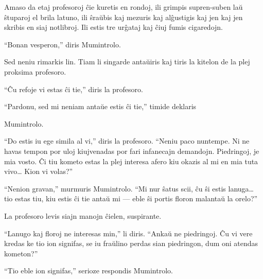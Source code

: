 Amaso da etaj profesoroj ĉie kuretis en rondoj, ili grimpis supren-suben laŭ ŝtuparoj el brila latuno, ili ŝraŭbis kaj mezuris kaj alĝustigis kaj jen kaj jen skribis en siaj notlibroj. Ili estis tre urĝataj kaj ĉiuj fumis cigaredojn.

``Bonan vesperon,'' diris Mumintrolo.

Sed neniu rimarkis lin. Tiam li singarde antaŭiris kaj tiris la kitelon de la plej proksima profesoro.

``Ĉu refoje vi estas ĉi tie,'' diris la profesoro.

``Pardonu, sed mi neniam antaŭe estis ĉi tie,'' timide deklaris

Mumintrolo.

``Do estis iu ege simila al vi,'' diris la profesoro. ``Neniu paco nuntempe. Ni ne havas tempon por uloj kiujvenadas por fari infanecajn demandojn. Piedringoj, je mia vosto. Ĉi tiu kometo estas la plej interesa afero kiu okazis al mi en mia tuta vivo{\ldots} Kion vi volas?''

``Nenion gravan,'' murmuris Mumintrolo. ``Mi nur ŝatus scii, ĉu ŝi estis lanuga{\ldots} tio estas tiu, kiu estis ĉi tie antaŭ mi --- eble ŝi portis floron malantaŭ la orelo?''

La profesoro levis siajn manojn ĉielen, suspirante.

``Lanugo kaj floroj ne interesas min,'' li diris. ``Ankaŭ ne piedringoj. Ĉu vi vere kredas ke tio ion signifas, se iu fraŭlino perdas sian piedringon, dum oni atendas kometon?''

``Tio eble ion signifas,'' serioze respondis Mumintrolo.

